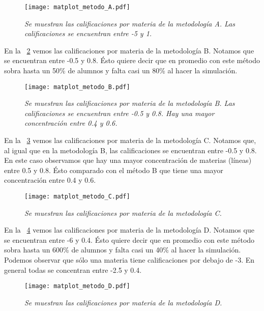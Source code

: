 \begin{figure}[h]
\centering
\texttt{[image: matplot\_metodo\_A.pdf]} %
\caption[\textit{Calificaciones metodología A}]{\textit{Se muestran las calificaciones por materia de la metodología A. Las calificaciones se encuentran entre -5 y 1.}}\label{fig_metodo_A}
\end{figure}


En la \figurename{~\ref{fig_metodo_B}} vemos las calificaciones por materia de la metodología B. Notamos que se encuentran entre -0.5 y 0.8. Ésto quiere decir que en promedio con este método sobra hasta un 50\% de alumnos y falta casi un 80\% al hacer la simulación.

\begin{figure}[H]
\centering
\texttt{[image: matplot\_metodo\_B.pdf]} %
\caption[\textit{Calificaciones metodología B}]{\textit{Se muestran las calificaciones por materia de la metodología B. Las calificaciones se encuentran entre -0.5 y 0.8. Hay una mayor concentración entre 0.4 y 0.6.}}\label{fig_metodo_B}
\end{figure}

En la \figurename{~\ref{fig_metodo_C}} vemos las calificaciones por materia de la metodología C. Notamos que, al igual que en la metodología B, las calificaciones se encuentran entre -0.5 y 0.8. En este caso observamos que hay una mayor concentración de materias (líneas) entre 0.5 y 0.8. Ésto comparado con el método B que tiene una mayor concentración entre 0.4 y 0.6.

\begin{figure}[H]
\centering
\texttt{[image: matplot\_metodo\_C.pdf]} %
\caption[\textit{Calificaciones metodología C}]{\textit{Se muestran las calificaciones por materia de la metodología C.}}\label{fig_metodo_C}
\end{figure}

En la \figurename{~\ref{fig_metodo_D}} vemos las calificaciones por materia de la metodología D. Notamos que se encuentran entre -6 y 0.4. Ésto quiere decir que en promedio con este método sobra hasta un 600\% de alumnos y falta casi un 40\% al hacer la simulación. Podemos observar que sólo una materia tiene calificaciones por debajo de -3. En general todas se concentran entre -2.5 y 0.4.


\begin{figure}[h]
\centering
\texttt{[image: matplot\_metodo\_D.pdf]} %
\caption[\textit{Calificaciones metodología D}]{\textit{Se muestran las calificaciones por materia de la metodología D.}}\label{fig_metodo_D}
\end{figure}


